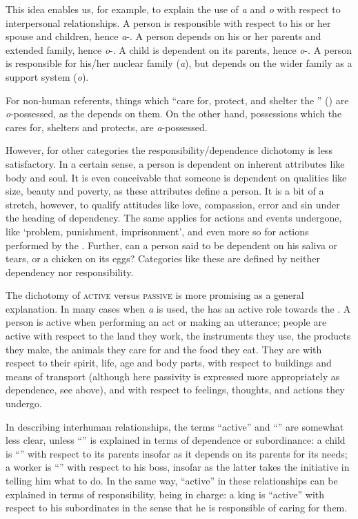 This idea enables us, for example, to explain the use of \textit{{\ꞌ}a} and \textit{o} with respect to interpersonal relationships. A person is responsible with respect to his or her spouse and children, hence \textit{a}{}-. A person depends on his or her parents and extended family, hence \textit{o}{}-. A child is dependent on its parents, hence \textit{o}{}-. A person is responsible for his/her nuclear family \mbox{(\textit{{\ꞌ}a}),} but depends on the wider family as a support system (\textit{o}).

For non-human referents, things which “care for, protect, and shelter the ” (\citealt[23]{MulloyRapu1977}) are \textit{o}{}-possessed, as the  depends on them. On the other hand, possessions which the  cares for, shelters and protects, are \textit{a}{}-possessed. 

However, for other categories the responsibility/dependence dichotomy is less satisfactory. In a certain sense, a person is dependent on inherent attributes like body and soul. It is even conceivable that someone is dependent on qualities like size, beauty and poverty, as these attributes define a person. It is a bit of a stretch, however, to qualify attitudes like love, compassion, error and sin under the heading of dependency. The same applies for actions and events undergone, like ‘problem, punishment, imprisonment’, and even more so for actions performed by the . Further, can a person said to be dependent on his saliva or tears, or a chicken on its eggs? Categories like these are defined by neither dependency nor responsibility.

The dichotomy of \textsc{active} versus \textsc{passive} is more promising as a general explanation. In many cases when \textit{{\ꞌ}a} is used, the  has an active role towards the . A person is active when performing an act or making an utterance; people are active with respect to the land they work, the instruments they use, the products they make, the animals they care for and the food they eat. They are  with respect to their spirit, life, age and body parts, with respect to buildings and means of transport (although here passivity is expressed more appropriately as dependence, see above), and with respect to feelings, thoughts, and actions they undergo.

In describing interhuman relationships, the terms “active” and “” are somewhat less clear, unless “” is explained in terms of dependence or subordinance: a child is “” with respect to its parents insofar as it depends on its parents for its needs; a worker is “” with respect to his boss, insofar as the latter takes the initiative in telling him what to do. In the same way, “active” in these relationships can be explained in terms of responsibility, being in charge: a king is “active” with respect to his subordinates in the sense that he is responsible of caring for them.

